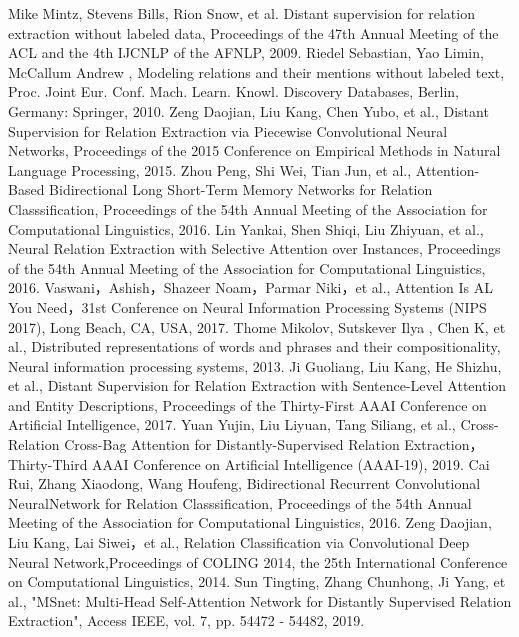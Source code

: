 \documentclass[UTF8]{csoarticle}
\begin{document}
\begin{thebibliography}{15}
     Mike Mintz, Stevens Bills, Rion Snow, et al. Distant supervision for relation extraction without labeled data, Proceedings of the 47th Annual Meeting of the ACL and the 4th IJCNLP of the AFNLP, 2009.
     Riedel Sebastian, Yao Limin, McCallum Andrew , Modeling relations and their mentions without labeled text, Proc. Joint Eur. Conf. Mach. Learn. Knowl. Discovery Databases, Berlin, Germany: Springer, 2010.
     Zeng Daojian, Liu Kang, Chen Yubo, et al., Distant Supervision for Relation Extraction via Piecewise Convolutional Neural Networks, Proceedings of the 2015 Conference on Empirical Methods in Natural Language Processing, 2015.
     Zhou Peng, Shi Wei, Tian Jun, et al.,  Attention-Based Bidirectional Long Short-Term Memory Networks for Relation Classsification, Proceedings of the 54th Annual Meeting of the Association for Computational Linguistics, 2016.
     Lin Yankai, Shen Shiqi, Liu Zhiyuan, et al., Neural Relation Extraction with Selective Attention over Instances, Proceedings of the 54th Annual Meeting of the Association for Computational Linguistics, 2016.
     Vaswani，Ashish，Shazeer Noam，Parmar Niki，et al., Attention Is AL You Need，31st Conference on Neural Information Processing Systems (NIPS 2017), Long Beach, CA, USA, 2017.
     Thome Mikolov, Sutskever Ilya , Chen K, et al., Distributed representations of words and phrases and their compositionality, Neural information processing systems, 2013.
     Ji Guoliang, Liu Kang, He Shizhu, et al., Distant Supervision for Relation Extraction with Sentence-Level Attention and Entity Descriptions, Proceedings of the Thirty-First AAAI Conference on Artificial Intelligence, 2017.
     Yuan Yujin, Liu Liyuan, Tang Siliang, et al., Cross-Relation Cross-Bag Attention for Distantly-Supervised Relation Extraction，Thirty-Third AAAI Conference on Artificial Intelligence (AAAI-19), 2019.
     Cai Rui, Zhang Xiaodong, Wang Houfeng, Bidirectional Recurrent Convolutional NeuralNetwork for Relation Classsification, Proceedings of the 54th Annual Meeting of the Association for Computational Linguistics, 2016.
     Zeng Daojian, Liu Kang, Lai Siwei，et al., Relation Classification via Convolutional Deep Neural Network,Proceedings of COLING 2014, the 25th International Conference on Computational Linguistics, 2014.
     Sun Tingting, Zhang Chunhong, Ji Yang, et al., "MSnet: Multi-Head Self-Attention Network for Distantly Supervised Relation Extraction", Access IEEE, vol. 7, pp. 54472 - 54482, 2019.
    
\end{thebibliography}
\end{document}
